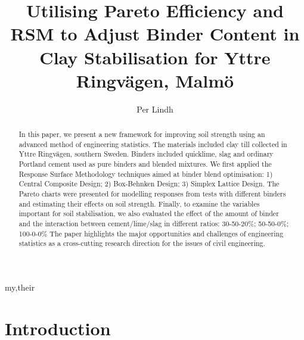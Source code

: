 \documentclass[eprint,
]{actapoly}
\begin{document}
\title[Pareto Efficiency and RSM to Adjust Binder Content]
{Utilising Pareto Efficiency and RSM to Adjust Binder Content in Clay Stabilisation for Yttre Ringvägen, Malmö}

\author[P. Lindh]{Per Lindh}{my,their}


\begin{abstract}
In this paper, we present a new framework for improving soil strength using an advanced method of engineering statistics. The materials included clay till collected in Yttre Ringvägen, southern Sweden. Binders included quicklime, slag and ordinary Portland cement used as pure binders and blended mixtures. We first applied the Response Surface Methodology techniques aimed at binder blend optimisation: 1) Central Composite Design; 2) Box-Behnken Design; 3) Simplex Lattice Design. The Pareto charts were presented for modelling responses from tests with different binders and estimating their effects on soil strength. Finally, to examine the variables important for soil stabilisation, we also evaluated the effect of the amount of binder and the interaction between cement/lime/slag in different ratios: 30-50-20\%; 50-50-0\%; 100-0-0\% The paper highlights the major opportunities and challenges of engineering statistics as a cross-cutting research direction for the issues of civil engineering.
\end{abstract}


\maketitle

\section{Introduction}
\end{document}
